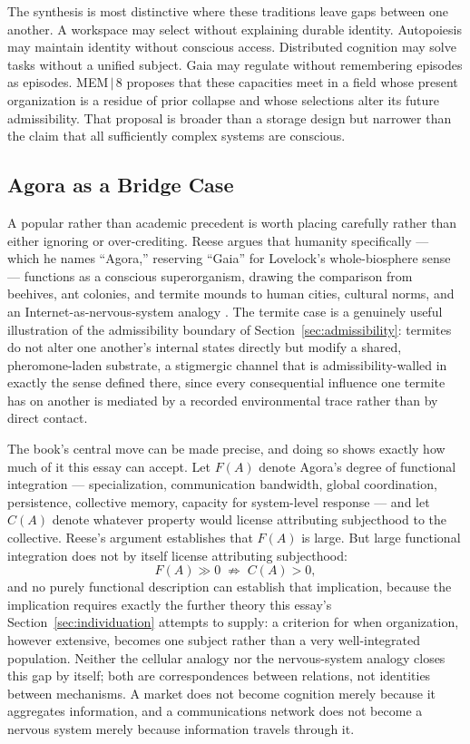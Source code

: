 \documentclass[11pt]{article}
\begin{document}
The synthesis is most distinctive where these traditions leave gaps between one another. A workspace may select without explaining durable identity. Autopoiesis may maintain identity without conscious access. Distributed cognition may solve tasks without a unified subject. Gaia may regulate without remembering episodes as episodes. MEM\,$|$\,8 proposes that these capacities meet in a field whose present organization is a residue of prior collapse and whose selections alter its future admissibility. That proposal is broader than a storage design but narrower than the claim that all sufficiently complex systems are conscious.

\subsection{Agora as a Bridge Case}

A popular rather than academic precedent is worth placing carefully rather than either ignoring or over-crediting. Reese argues that humanity specifically --- which he names ``Agora,'' reserving ``Gaia'' for Lovelock's whole-biosphere sense --- functions as a conscious superorganism, drawing the comparison from beehives, ant colonies, and termite mounds to human cities, cultural norms, and an Internet-as-nervous-system analogy \cite{reese2023}. The termite case is a genuinely useful illustration of the admissibility boundary of Section~\ref{sec:admissibility}: termites do not alter one another's internal states directly but modify a shared, pheromone-laden substrate, a stigmergic channel that is admissibility-walled in exactly the sense defined there, since every consequential influence one termite has on another is mediated by a recorded environmental trace rather than by direct contact.

The book's central move can be made precise, and doing so shows exactly how much of it this essay can accept. Let $F(A)$ denote Agora's degree of functional integration --- specialization, communication bandwidth, global coordination, persistence, collective memory, capacity for system-level response --- and let $C(A)$ denote whatever property would license attributing subjecthood to the collective. Reese's argument establishes that $F(A)$ is large. But large functional integration does not by itself license attributing subjecthood:
\[
F(A) \gg 0 \;\not\Longrightarrow\; C(A)>0,
\]
and no purely functional description can establish that implication, because the implication requires exactly the further theory this essay's Section~\ref{sec:individuation} attempts to supply: a criterion for when organization, however extensive, becomes one subject rather than a very well-integrated population. Neither the cellular analogy nor the nervous-system analogy closes this gap by itself; both are correspondences between relations, not identities between mechanisms. A market does not become cognition merely because it aggregates information, and a communications network does not become a nervous system merely because information travels through it.
\end{document}
